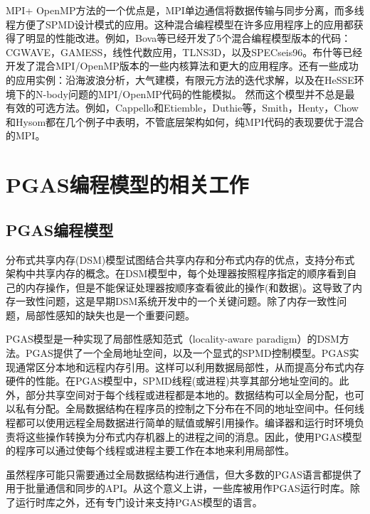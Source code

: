 MPI+ OpenMP方法的一个优点是，MPI单边通信将数据传输与同步分离，而多线程方便了SPMD设计模式的应用。这种混合编程模型在许多应用程序上的应用都获得了明显的性能改进。例如，Bova等已经开发了5个混合编程模型版本的代码\citep{bova1999combining}：CGWAVE，GAMESS，线性代数应用，TLNS3D，以及SPECseis96。布什等\citep{bush2000mixed}已经开发了混合MPI/OpenMP版本的一些内核算法和更大的应用程序。还有一些成功的应用实例：沿海波浪分析\citep{luong2001coastal}，大气建模\citep{loft2001terascale}，有限元方法的迭代求解\citep{nakajima2005parallel}，以及在HeSSE环境下的N-body问题的MPI/OpenMP代码的性能模拟\citep{aversa2005performance}。  
然而这个模型并不总是最有效的可选方法。例如，Cappello和Etiemble\citep{cappello2000mpi}，Duthie等\citep{duthie2004mixed}，Smith\citep{smith2000mixed}，Henty\citep{henty2000performance}，Chow和Hysom\citep{chow2001assessing}都在几个例子中表明，不管底层架构如何，纯MPI代码的表现要优于混合的MPI。

\section{PGAS编程模型的相关工作}

\subsection{PGAS编程模型}

分布式共享内存(DSM)模型试图结合共享内存和分布式内存的优点，支持分布式架构中共享内存的概念\citep{protic1995survey}。在DSM模型中，每个处理器按照程序指定的顺序看到自己的内存操作，但是不能保证处理器按顺序查看彼此的操作(和数据)。这导致了内存一致性问题，这是早期DSM系统开发中的一个关键问题。除了内存一致性问题，局部性感知的缺失也是一个重要问题。

PGAS模型是一种实现了局部性感知范式（locality-aware paradigm）\citep{coarfa2005evaluation}的DSM方法。PGAS提供了一个全局地址空间，以及一个显式的SPMD控制模型。PGAS实现通常区分本地和远程内存引用。这样可以利用数据局部性，从而提高分布式内存硬件的性能\citep{saraswat2010asynchronous}。在PGAS模型中，SPMD线程(或进程)共享其部分地址空间的。此外，部分共享空间对于每个线程或进程都是本地的。数据结构可以全局分配，也可以私有分配。全局数据结构在程序员的控制之下分布在不同的地址空间中。任何线程都可以使用远程全局数据进行简单的赋值或解引用操作。编译器和运行时环境负责将这些操作转换为分布式内存机器上的进程之间的消息。因此，使用PGAS模型的程序可以通过使每个线程或进程主要工作在本地来利用局部性。 
 
虽然程序可能只需要通过全局数据结构进行通信，但大多数的PGAS语言都提供了用于批量通信和同步的API。从这个意义上讲，一些库被用作PGAS运行时库。除了运行时库之外，还有专门设计来支持PGAS模型的语言。

